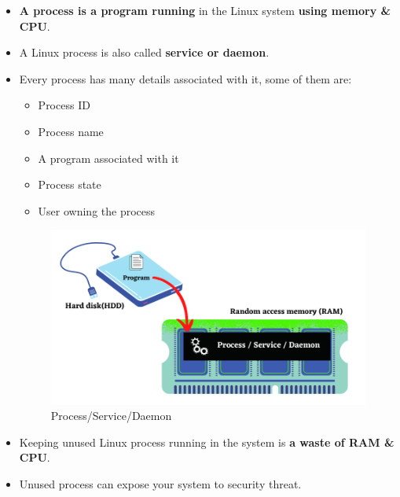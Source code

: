 \setlength{\columnsep}{3pt}
\begin{flushleft}
	\begin{itemize}
		\item \textbf{A process is a program running} in the Linux system \textbf{using memory \& CPU}.
		\item A Linux process is also called \textbf{service or daemon}.
		\item Every process has many details associated with it, some of them are:
		\begin{itemize}
			\item Process ID
			\item Process name
			\item A program associated with it
			\item Process state
			\item User owning the process
		\end{itemize}
		
		\begin{figure}[h!]
			\centering
			\includegraphics[scale=.55]{content/chapter12/images/process.png}
			\caption{Process/Service/Daemon}
			\label{fig:process}
		\end{figure}
		
		\item Keeping unused Linux process running in the system is \textbf{a waste of RAM \& CPU}.
		\item Unused process can expose your system to \color{red}security threat.
	\end{itemize}
\end{flushleft}

\newpage


